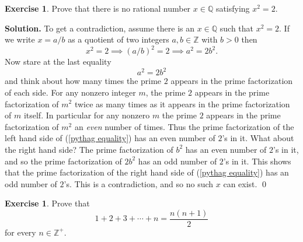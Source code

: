 \documentclass[10pt]{article}
\newcommand{\Z}{\mathbb Z}
\newcommand{\Q}{\mathbb Q}
\theoremstyle{definition}
\theoremstyle{remark}
\theoremstyle{definition}
\newtheorem{Exercise}[Thm]{Exercise}
\newenvironment{Solution}{\noindent\textbf{Solution.}}{\qed}
\begin{document}
  
 
\author{Professor Howard}
\title{}
\date{September 8, 2010}
\maketitle
 
\pagestyle{plain}   %
 
 
\begin{Exercise}
Prove that there is no rational number $x\in\Q$ satisfying $x^2=2$.
\end{Exercise}
 
\begin{Solution}
To get a contradiction, assume there is an $x\in\Q$ such that $x^2=2$.  
If we write $x=a/b$ as a quotient of two integers $a,b\in \Z$ with $b>0$ then
\[
x^2 =2 \implies (a/b)^2 =2 \implies a^2 = 2b^2.
\]
Now stare at the last equality
\begin{equation}\label{pythag equality}
a^2=2b^2
\end{equation}
and think about how many times the prime $2$ appears in the  prime factorization of each side.
For any nonzero integer $m$, the prime  $2$ appears in the prime factorization of $m^2$  twice as many times
as it appears in the prime factorization of $m$ itself.  In particular for any nonzero $m$ the prime $2$ appears in the
prime factorization of $m^2$ an \emph{even} number of times.  Thus the prime factorization of the left hand side of
(\ref{pythag equality}) has an even number of $2$'s in it.  What about the right hand side?  The prime factorization of $b^2$
has an even number of $2$'s in it, and so the prime factorization of $2b^2$ has an odd number of $2$'s in it.  This 
shows that the prime factorization of the right hand side of (\ref{pythag equality}) has an odd number of $2$'s.
This is a contradiction, and so no such $x$ can exist.
\end{Solution}
 
\par\bigskip
 
 
 
 
\begin{Exercise}
Prove that 
\[
1+2+3+\cdots+ n = \frac{n(n+1)}{2}
\]
for every $n\in \Z^+$.
\end{Exercise}
 
\end{document}
